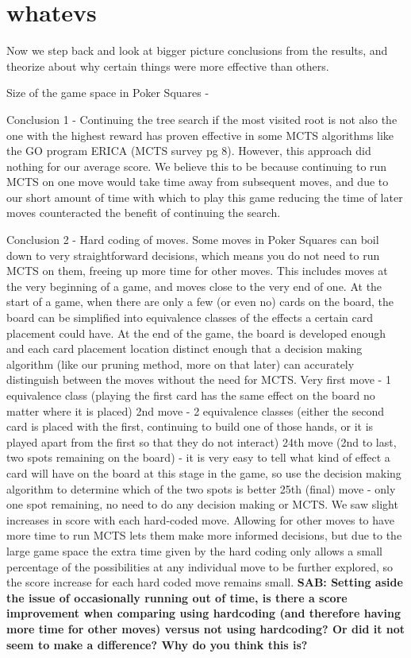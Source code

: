 \documentclass[letterpaper]{article}
\begin{document}

\section{whatevs}

Now we step back and look at bigger picture conclusions from the results, and theorize about why certain things were more effective than others.

Size of the game space in Poker Squares - 

Conclusion 1 - Continuing the tree search if the most visited root is not also the one with the highest reward has proven effective in some MCTS algorithms like the GO program ERICA (MCTS survey pg 8). However, this approach did nothing for our average score. We believe this to be because continuing to run MCTS on one move would take time away from subsequent moves, and due to our short amount of time with which to play this game reducing the time of later moves counteracted the benefit of continuing the search.

Conclusion 2 - Hard coding of moves. Some moves in Poker Squares can boil down to very straightforward decisions, which means you do not need to run MCTS on them, freeing up more time for other moves. This includes moves at the very beginning of a game, and moves close to the very end of one. At the start of a game, when there are only a few (or even no) cards on the board, the board can be simplified into equivalence classes of the effects a certain card placement could have. At the end of the game, the board is developed enough and each card placement location distinct enough that a decision making algorithm (like our pruning method, more on that later) can accurately distinguish between the moves without the need for MCTS.
	Very first move - 1 equivalence class (playing the first card has the same effect on the board no matter where it is placed)
	2nd move - 2 equivalence classes (either the second card is placed with the first, continuing to build one of those hands, or it is played apart from the first so that they do not interact)
	24th move (2nd to last, two spots remaining on the board) - it is very easy to tell what kind of effect a card will have on the board at this stage in the game, so use the decision making algorithm to determine which of the two spots is better
	25th (final) move - only one spot remaining, no need to do any decision making or MCTS.
We saw slight increases in score with each hard-coded move. Allowing for other moves to have more time to run MCTS lets them make more informed decisions, but due to the large game space the extra time given by the hard coding only allows a small percentage of the possibilities at any individual move to be further explored, so the score increase for each hard coded move remains small.
{\bf SAB: Setting aside the issue of occasionally running out of time, is there a score improvement when comparing using hardcoding (and therefore having more time for other moves) versus not using hardcoding? Or did it not seem to make a difference? Why do you think this is?}
\end{document}
